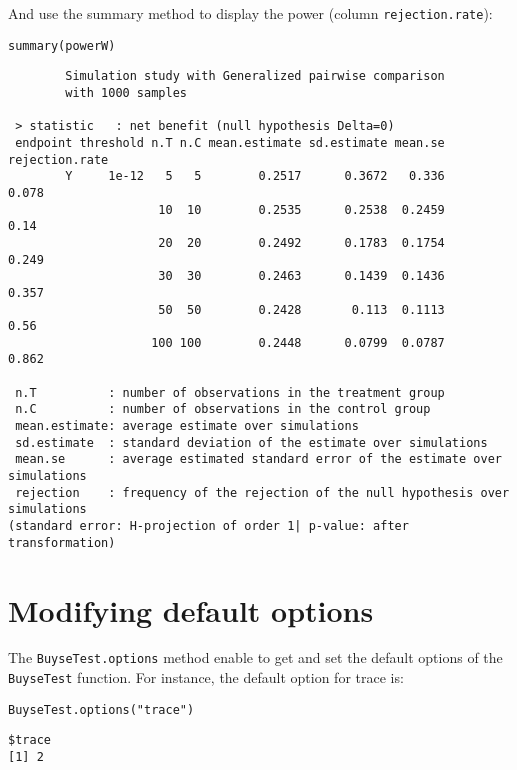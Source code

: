 \documentclass[12pt]{article}
\begin{document}
\clearpage

And use the summary method to display the power (column
\texttt{rejection.rate}):
\lstset{language=r,label= ,caption= ,captionpos=b,numbers=none}
\begin{lstlisting}
summary(powerW)
\end{lstlisting}

\begin{verbatim}
        Simulation study with Generalized pairwise comparison
        with 1000 samples

 > statistic   : net benefit (null hypothesis Delta=0)
 endpoint threshold n.T n.C mean.estimate sd.estimate mean.se rejection.rate
        Y     1e-12   5   5        0.2517      0.3672   0.336          0.078
                     10  10        0.2535      0.2538  0.2459           0.14
                     20  20        0.2492      0.1783  0.1754          0.249
                     30  30        0.2463      0.1439  0.1436          0.357
                     50  50        0.2428       0.113  0.1113           0.56
                    100 100        0.2448      0.0799  0.0787          0.862

 n.T          : number of observations in the treatment group
 n.C          : number of observations in the control group
 mean.estimate: average estimate over simulations
 sd.estimate  : standard deviation of the estimate over simulations
 mean.se      : average estimated standard error of the estimate over simulations
 rejection    : frequency of the rejection of the null hypothesis over simulations
(standard error: H-projection of order 1| p-value: after transformation)
\end{verbatim}

\clearpage

\section{Modifying default options}
\label{sec:org16eb1fb}
The \texttt{BuyseTest.options} method enable to get and set the default
options of the \texttt{BuyseTest} function. For instance, the default option
for trace is:
\lstset{language=r,label= ,caption= ,captionpos=b,numbers=none}
\begin{lstlisting}
BuyseTest.options("trace")
\end{lstlisting}

\begin{verbatim}
$trace
[1] 2
\end{verbatim}
\end{document}
